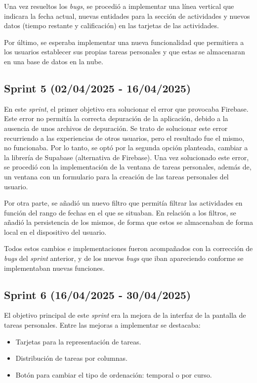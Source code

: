 Una vez resueltos los \textit{bugs}, se procedió a implementar una línea vertical que indicara la fecha actual, nuevas entidades para la sección de actividades y nuevos datos (tiempo restante y calificación) en las tarjetas de las actividades.

Por último, se esperaba implementar una nueva funcionalidad que permitiera a los usuarios establecer sus propias tareas personales y que estas se almacenaran en una base de datos en la nube.

\subsection{Sprint 5 (02/04/2025 - 16/04/2025)}
En este \textit{sprint}, el primer objetivo era solucionar el error que provocaba Firebase. Este error no permitía la correcta depuración de la aplicación, debido a la ausencia de unos archivos de depuración. Se trato de solucionar este error recurriendo a las experiencias de otros usuarios, pero el resultado fue el mismo, no funcionaba. Por lo tanto, se optó por la segunda opción planteada, cambiar a la librería de Supabase (alternativa de Firebase). Una vez solucionado este error, se procedió con la implementación de la ventana de tareas personales, además de, un ventana con un formulario para la creación de las tareas personales del usuario.

Por otra parte, se añadió un nuevo filtro que permitía filtrar las actividades en función del rango de fechas en el que se situaban. En relación a los filtros, se añadió la persistencia de los mismos, de forma que estos se almacenaban de forma local en el dispositivo del usuario.

Todos estos cambios e implementaciones fueron acompañados con la corrección de \textit{bugs} del \textit{sprint} anterior, y de los nuevos \textit{bugs} que iban apareciendo conforme se implementaban nuevas funciones.

\subsection{Sprint 6 (16/04/2025 - 30/04/2025)}
El objetivo principal de este \textit{sprint} era la mejora de la interfaz de la pantalla de tareas personales. Entre las mejoras a implementar se destacaba:
\begin{itemize}
    \item Tarjetas para la representación de tareas.
    \item Distribución de tareas por columnas.
    \item Botón para cambiar el tipo de ordenación: temporal o por curso.
\end{itemize}

